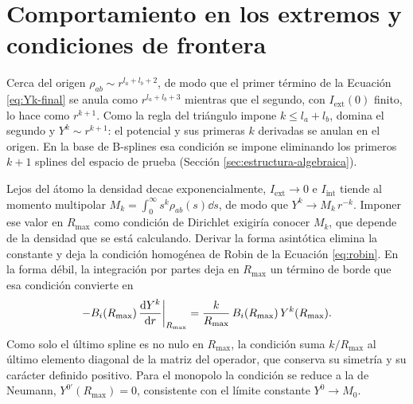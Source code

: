 \section{Comportamiento en los extremos y condiciones de frontera}
\label{sec:condiciones-frontera}

Cerca del origen $\rho_{ab} \sim r^{l_a + l_b + 2}$, de modo que el primer término de la Ecuación \eqref{eq:Yk-final} se anula como $r^{l_a+l_b+3}$ mientras que el segundo, con $I_{\text{ext}}(0)$ finito, lo hace como $r^{k+1}$. Como la regla del triángulo impone $k \le l_a + l_b$, domina el segundo y $Y^k \sim r^{k+1}$: el potencial y sus primeras $k$ derivadas se anulan en el origen. En la base de B-splines esa condición se impone eliminando los primeros $k+1$ splines del espacio de prueba (Sección \ref{sec:estructura-algebraica}).

Lejos del átomo la densidad decae exponencialmente, $I_{\text{ext}} \to 0$ e $I_{\text{int}}$ tiende al momento multipolar $M_k = \int_0^\infty s^k \rho_{ab}(s)\dd{s}$, de modo que $Y^k \to M_k\, r^{-k}$. Imponer ese valor en $R_{\text{max}}$ como condición de Dirichlet exigiría conocer $M_k$, que depende de la densidad que se está calculando. Derivar la forma asintótica elimina la constante y deja la condición homogénea de Robin de la Ecuación \eqref{eq:robin}. En la forma débil, la integración por partes deja en $R_{\text{max}}$ un término de borde que esa condición convierte en
\begin{equation}
 -B_i(R_{\text{max}})\, \dv{Y^k}{r}\bigg|_{R_{\text{max}}} = \frac{k}{R_{\text{max}}}\, B_i(R_{\text{max}})\, Y^k(R_{\text{max}}).
\end{equation}
Como solo el último spline es no nulo en $R_{\text{max}}$, la condición suma $k/R_{\text{max}}$ al último elemento diagonal de la matriz del operador, que conserva su simetría y su carácter definido positivo. Para el monopolo la condición se reduce a la de Neumann, $Y^{0\prime}(R_{\text{max}}) = 0$, consistente con el límite constante $Y^0 \to M_0$.

